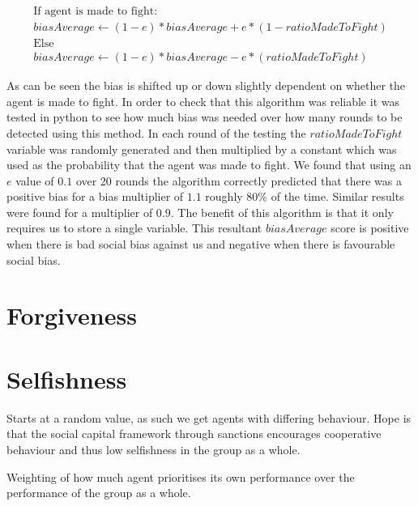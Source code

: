 \begin{align*}
\text{If agent is made to fight:} \\
biasAverage \leftarrow (1-e)*biasAverage + e*(1-ratioMadeToFight) \\
\text{Else} \\
biasAverage \leftarrow (1-e)*biasAverage - e*(ratioMadeToFight)
\end{align*}

As can be seen the bias is shifted up or down slightly dependent on whether the agent is made to fight. In order to check that this algorithm was reliable it was tested in python to see how much bias was needed over how many rounds to be detected using this method. In each round of the testing the $ratioMadeToFight$ variable was randomly generated and then multiplied by a constant which was used as the probability that the agent was made to fight. We found that using an $e$ value of $0.1$ over 20 rounds the algorithm correctly predicted that there was a positive bias for a bias multiplier of $1.1$ roughly $80\%$ of the time. Similar results were found for a multiplier of $0.9$. The benefit of this algorithm is that it only requires us to store a single variable. This resultant $biasAverage$ score is positive when there is bad social bias against us and negative when there is favourable social bias.

\section{Forgiveness}

\section{Selfishness}

Starts at a random value, as such we get agents with differing behaviour. Hope is that the social capital framework through sanctions encourages cooperative behaviour and thus low selfishness in the group as a whole.

Weighting of how much agent prioritises its own performance over the performance of the group as a whole.

